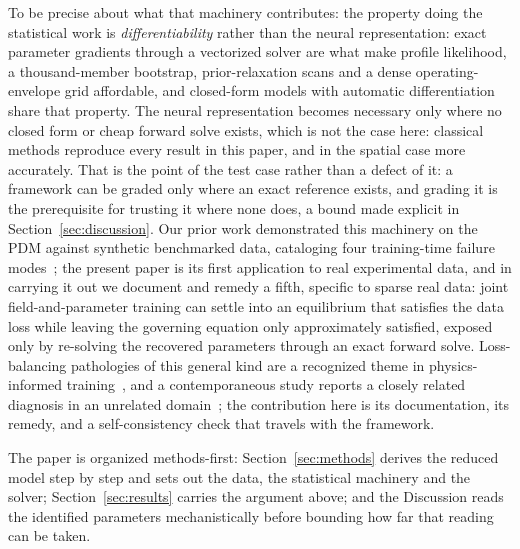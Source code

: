\documentclass[a4paper,fleqn]{cas-sc}
\begin{document}
To be precise about what that machinery contributes: the
property doing the statistical work is \emph{differentiability} rather
than the neural representation: exact parameter gradients through a
vectorized solver are what make profile likelihood, a thousand-member
bootstrap, prior-relaxation scans and a dense operating-envelope grid
affordable, and closed-form models with automatic differentiation share
that property. The neural representation becomes necessary only where no
closed form or cheap forward solve exists, which is not the case here:
classical methods reproduce every result in this paper, and in the
spatial case more accurately. That is the point of the test case rather
than a defect of it: a framework can be graded only where an exact
reference exists, and grading it is the prerequisite for trusting it
where none does, a bound made explicit in Section~\ref{sec:discussion}. Our
prior work demonstrated this machinery on the PDM against synthetic
benchmarked data, cataloging four training-time failure
modes~\citep{farooqi2025pinnpdm}; the present paper is its first
application to real experimental data, and in carrying it out we
document and remedy a fifth, specific to sparse real data: joint
field-and-parameter training can settle into an equilibrium that
satisfies the data loss while leaving the governing equation only
approximately satisfied, exposed only by re-solving the recovered
parameters through an exact forward solve. Loss-balancing pathologies of
this general kind are a recognized theme in physics-informed
training~\citep{wang2022ntk,krishnapriyan2021failure}, and a
contemporaneous study reports a closely related diagnosis in an
unrelated domain~\citep{pinnverse2025}; the contribution here is its
documentation, its remedy, and a self-consistency check that travels
with the framework.

The paper is organized methods-first: Section~\ref{sec:methods} derives
the reduced model step by step and sets out the data, the statistical
machinery and the solver; Section~\ref{sec:results} carries the argument
above; and the Discussion reads the identified parameters
mechanistically before bounding how far that reading can be taken.

\end{document}
